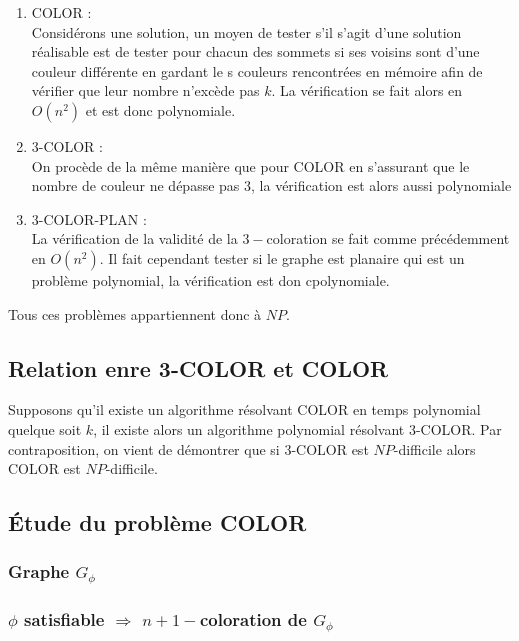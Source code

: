 \begin{enumerate}
	\item COLOR : \\
		Considérons une solution, un moyen de tester s'il s'agit d'une solution réalisable est de tester
		pour chacun des sommets si ses voisins sont d'une couleur différente en gardant le s couleurs
		rencontrées en mémoire afin de vérifier que leur nombre n'excède pas $k$. La vérification se
		fait alors en $O(n^2)$ et est donc polynomiale.
	\item 3-COLOR : \\
		On procède de la même manière que pour COLOR en s'assurant que le nombre de couleur ne dépasse
		pas $3$, la vérification est alors aussi polynomiale
	\item 3-COLOR-PLAN : \\
		La vérification de la validité de la $3-$coloration se fait comme précédemment en $O(n^2)$. Il
		fait cependant tester si le graphe est planaire qui est un problème polynomial, la vérification
		est don cpolynomiale.
\end{enumerate}

Tous ces problèmes appartiennent donc à $NP$.

\subsection{Relation enre 3-COLOR et COLOR}

Supposons qu'il existe un algorithme résolvant COLOR en temps polynomial quelque soit $k$, il existe
alors un algorithme polynomial résolvant 3-COLOR. Par contraposition, on vient de démontrer que si
3-COLOR est $NP$-difficile alors COLOR est $NP$-difficile.

\subsection{Étude du problème COLOR}

\subsubsection{Graphe $G_{\phi}$}



\subsubsection{$\phi$ satisfiable $\Rightarrow$ $n+1-$coloration de $G_\phi$}

